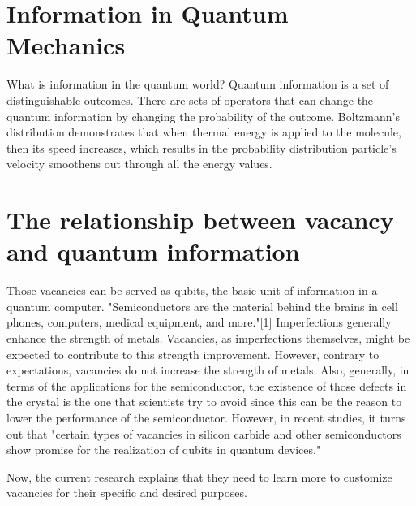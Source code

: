 \documentclass{article}
\begin{document}
\section{Information in Quantum Mechanics}
What is information in the quantum world? 
Quantum information is a set of distinguishable outcomes.
There are sets of operators that can change the quantum information by changing the probability of the outcome.
Boltzmann's distribution demonstrates that when thermal energy is applied to the molecule, 
then its speed increases, which results in the probability distribution particle's velocity smoothens out through all the energy values.  

\section{The relationship between vacancy and quantum information}
Those vacancies can be served as qubits, the basic unit of information in a quantum computer. 
"Semiconductors are the material behind the brains in cell phones, computers, medical equipment, and more."[1] 
Imperfections generally enhance the strength of metals. 
Vacancies, as imperfections themselves, might be expected to contribute to this strength improvement. 
However, contrary to expectations, vacancies do not increase the strength of metals.
Also, generally, in terms of the applications for the semiconductor, the existence of those defects in the crystal is the one that scientists try to avoid since this can be the reason to lower the performance of the semiconductor. 
However, in recent studies, it turns out that "certain types of vacancies in silicon carbide and other semiconductors show promise for the realization of qubits in quantum devices." 

Now, the current research explains that they need to learn more to customize vacancies for their specific and desired purposes. 
\end{document}
